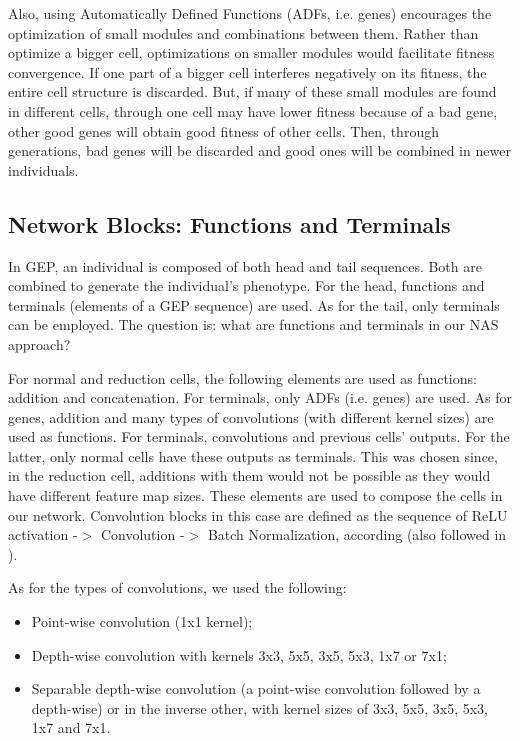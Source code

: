 \documentclass[conference]{IEEEtran}
\begin{document}
	Also, using Automatically Defined Functions (ADFs, i.e. genes) encourages the optimization of small modules and combinations between them.
	Rather than optimize a bigger cell, optimizations on smaller modules would facilitate fitness convergence.
	If one part of a bigger cell interferes negatively on its fitness, the entire cell structure is discarded.
	But, if many of these small modules are found in different cells, through one cell may have lower fitness because of a bad gene, other good genes will obtain good fitness of other cells.
	Then, through generations, bad genes will be discarded and good ones will be combined in newer individuals.
	
	\subsection{Network Blocks: Functions and Terminals}
	
	In GEP, an individual is composed of both head and tail sequences.
	Both are combined to generate the individual's phenotype.
	For the head, functions and terminals (elements of a GEP sequence) are used.
	As for the tail, only terminals can be employed.
	The question is: what are functions and terminals in our NAS approach?
	
	For normal and reduction cells, the following elements are used as functions: addition and concatenation.
	For terminals, only ADFs (i.e. genes) are used.
	As for genes, addition and many types of convolutions (with different kernel sizes) are used as functions.
	For terminals, convolutions and previous cells' outputs. For the latter, only normal cells have these outputs as terminals. This was chosen since, in the reduction cell, additions with them would not be possible as they would have different feature map sizes.
	These elements are used to compose the cells in our network.
	Convolution blocks in this case are defined as the sequence of ReLU activation -$>$ Convolution -$>$ Batch Normalization, according \cite{he2016identity} (also followed in \cite{zoph2017learning}). 
	
	As for the types of convolutions, we used the following:
	\begin{itemize}
		\item Point-wise convolution (1x1 kernel);
		\item Depth-wise convolution with kernels 3x3, 5x5, 3x5, 5x3, 1x7 or 7x1;
		\item Separable depth-wise convolution (a point-wise convolution followed by a depth-wise) or in the inverse other, with kernel sizes of 3x3, 5x5, 3x5, 5x3, 1x7 and 7x1.
	\end{itemize}
	
\end{document}
